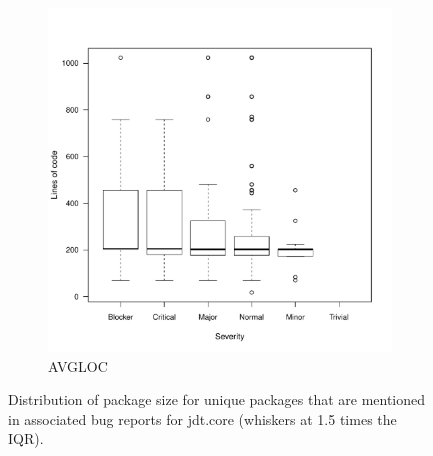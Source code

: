 \begin{figure}
        \begin{subfigure}[b]{0.5\textwidth}
                \centering
                \includegraphics[width=\textwidth]{img/core-avgloc-sev-boxplot.pdf}
                \caption{AVGLOC}
                \label{fig:box-sevcore-avgloc}
        \end{subfigure}
        \caption{Distribution of package size for unique packages that are mentioned in associated bug reports for jdt.core (whiskers at 1.5 times the IQR).}
        \label{fig:packages-box-sevcore}
\end{figure}

